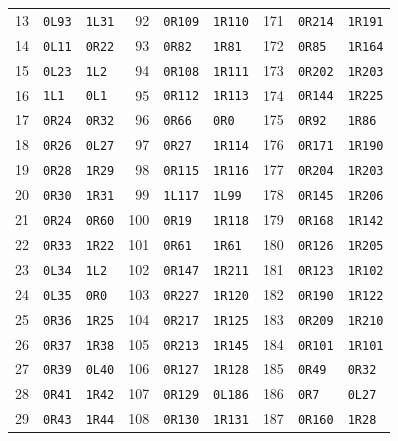 \begin{longtable}{rll@{\qquad}rll@{\qquad}rll}
13 & \texttt{0L93} & \texttt{1L31} & 92 & \texttt{0R109} & \texttt{1R110} & 171 & \texttt{0R214} & \texttt{1R191}\\
14 & \texttt{0L11} & \texttt{0R22} & 93 & \texttt{0R82} & \texttt{1R81} & 172 & \texttt{0R85} & \texttt{1R164}\\
15 & \texttt{0L23} & \texttt{1L2} & 94 & \texttt{0R108} & \texttt{1R111} & 173 & \texttt{0R202} & \texttt{1R203}\\
16 & \texttt{1L1} & \texttt{0L1} & 95 & \texttt{0R112} & \texttt{1R113} & 174 & \texttt{0R144} & \texttt{1R225}\\
17 & \texttt{0R24} & \texttt{0R32} & 96 & \texttt{0R66} & \texttt{0R0} & 175 & \texttt{0R92} & \texttt{1R86}\\
18 & \texttt{0R26} & \texttt{0L27} & 97 & \texttt{0R27} & \texttt{1R114} & 176 & \texttt{0R171} & \texttt{1R190}\\
19 & \texttt{0R28} & \texttt{1R29} & 98 & \texttt{0R115} & \texttt{1R116} & 177 & \texttt{0R204} & \texttt{1R203}\\
20 & \texttt{0R30} & \texttt{1R31} & 99 & \texttt{1L117} & \texttt{1L99} & 178 & \texttt{0R145} & \texttt{1R206}\\
21 & \texttt{0R24} & \texttt{0R60} & 100 & \texttt{0R19} & \texttt{1R118} & 179 & \texttt{0R168} & \texttt{1R142}\\
22 & \texttt{0R33} & \texttt{1R22} & 101 & \texttt{0R61} & \texttt{1R61} & 180 & \texttt{0R126} & \texttt{1R205}\\
23 & \texttt{0L34} & \texttt{1L2} & 102 & \texttt{0R147} & \texttt{1R211} & 181 & \texttt{0R123} & \texttt{1R102}\\
24 & \texttt{0L35} & \texttt{0R0} & 103 & \texttt{0R227} & \texttt{1R120} & 182 & \texttt{0R190} & \texttt{1R122}\\
25 & \texttt{0R36} & \texttt{1R25} & 104 & \texttt{0R217} & \texttt{1R125} & 183 & \texttt{0R209} & \texttt{1R210}\\
26 & \texttt{0R37} & \texttt{1R38} & 105 & \texttt{0R213} & \texttt{1R145} & 184 & \texttt{0R101} & \texttt{1R101}\\
27 & \texttt{0R39} & \texttt{0L40} & 106 & \texttt{0R127} & \texttt{1R128} & 185 & \texttt{0R49} & \texttt{0R32}\\
28 & \texttt{0R41} & \texttt{1R42} & 107 & \texttt{0R129} & \texttt{0L186} & 186 & \texttt{0R7} & \texttt{0L27}\\
29 & \texttt{0R43} & \texttt{1R44} & 108 & \texttt{0R130} & \texttt{1R131} & 187 & \texttt{0R160} & \texttt{1R28}\\

\end{longtable}
